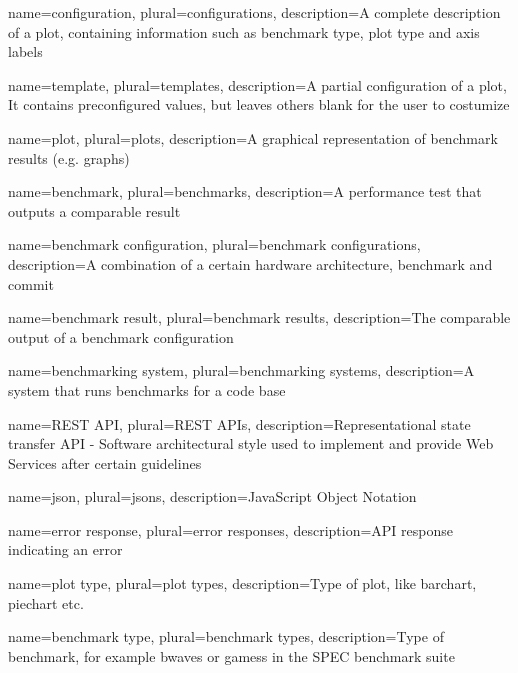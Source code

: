 \makenoidxglossaries

{
	name=configuration,
	plural=configurations,
	description={A complete description of a \gls{plot}, containing information such as benchmark type, \gls{plot type} and axis labels}
}

{
	name=template,
	plural=templates,
	description={A partial configuration of a \gls{plot}, It contains preconfigured values, but leaves others blank for the user to costumize}
}

{
	name=plot,
	plural=plots,
	description={A graphical representation of \glspl{benchmark result} (e.g. graphs)}
}

{
	name=benchmark,
	plural=benchmarks,
	description={A performance test that outputs a comparable result}
}

{
	name=benchmark configuration,
	plural=benchmark configurations,
	description={A combination of a certain hardware architecture, \gls{benchmark} and commit}
}

{
	name=benchmark result,
	plural=benchmark results,
	description={The comparable output of a \gls{benchmark configuration}}
}

{
	name=benchmarking system,
	plural=benchmarking systems,
	description={A system that runs benchmarks for a code base}
}

{
	name=REST API,
	plural=REST APIs,
	description={Representational state transfer API - Software architectural style used to implement and provide Web Services after certain guidelines}
}


{
    name=json,
    plural=jsons,
    description={JavaScript Object Notation}
}

{
    name=error response,
    plural=error responses,
    description={API response indicating an error}
}

{
    name=plot type,
    plural=plot types,
    description={Type of plot, like barchart, piechart etc.}
}

{
    name=benchmark type,
    plural=benchmark types,
    description={Type of benchmark, for example bwaves or gamess in the SPEC benchmark suite}
}
